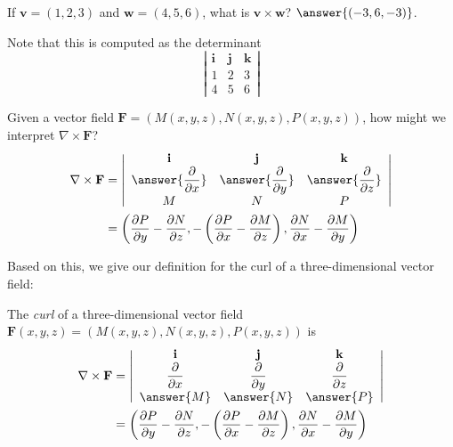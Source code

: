 \documentclass{ximera}
\begin{document}
\begin{problem}
If $\mathbf{v}=(1,2,3)$ and $\mathbf{w}=(4,5,6)$, what is $\mathbf{v}\times\mathbf{w}$?
$\answer{(-3,6,-3)}$.
\begin{problem}
Note that this is computed as the determinant
\[
\left|\begin{array}{ccc}
\mathbf{i}&\mathbf{j}&\mathbf{k}\\
1&2&3\\
4&5&6
\end{array}\right|
\]
\begin{problem}
Given a vector field $\mathbf{F}=(M(x,y,z),N(x,y,z),P(x,y,z))$, how might we interpret $\nabla\times\mathbf{F}$?
\begin{align*}
\nabla\times\mathbf{F} &= \left|\begin{array}{ccc}
\mathbf{i}&\mathbf{j}&\mathbf{k}\\
\answer{\dfrac{\partial}{\partial x}}&\answer{\dfrac{\partial}{\partial y}}&\answer{\dfrac{\partial}{\partial z}}\\
M&N&P
\end{array}\right|\\
&= \left(\dfrac{\partial P}{\partial y}-\dfrac{\partial N}{\partial z}, -\left(\dfrac{\partial P}{\partial x}-\dfrac{\partial M}{\partial z}\right), \dfrac{\partial N}{\partial x} - \dfrac{\partial M}{\partial y}\right)
\end{align*}
\end{problem}
\end{problem}
\end{problem}

Based on this, we give our definition for the curl of a three-dimensional vector field:

\begin{definition}
The \emph{curl} of a three-dimensional vector field $\mathbf{F}(x,y,z) = (M(x,y,z), N(x,y,z), P(x,y,z))$ is
\begin{align*}
\nabla\times\mathbf{F} &= \left|\begin{array}{ccc}
\mathbf{i}&\mathbf{j}&\mathbf{k}\\
\dfrac{\partial}{\partial x}&\dfrac{\partial}{\partial y}&\dfrac{\partial}{\partial z}\\
\answer{M}&\answer{N}&\answer{P}
\end{array}\right|\\
&= \left(\dfrac{\partial P}{\partial y}-\dfrac{\partial N}{\partial z}, -\left(\dfrac{\partial P}{\partial x}-\dfrac{\partial M}{\partial z}\right), \dfrac{\partial N}{\partial x} - \dfrac{\partial M}{\partial y}\right)
\end{align*}
\end{definition}
\end{document}
